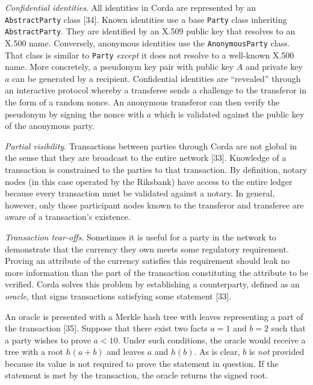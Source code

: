 \textit{Confidential identities}. All identities in Corda are represented by an \texttt{AbstractParty} class [34]. Known identities use a base \texttt{Party} class inheriting \texttt{AbstractParty}. They are identified by an X.509 public key that resolves to an X.500 name. Conversely, anonymous identities use the \texttt{AnonymousParty} class. That class is similar to \texttt{Party} \textit{except} it does not resolve to a well-known X.500 name. More concretely, a pseudonym key pair with public key $A$ and private key $a$ can be generated by a recipient. Confidential identities are ``revealed'' through an interactive protocol whereby a transferee sends a challenge to the transferor in the form of a random nonce. An anonymous transferor can then verify the pseudonym by signing the nonce with $a$ which is validated against the public key of the anonymous party.

\textit{Partial visibility}. Transactions between parties through Corda are not global in the sense that they are broadcast to the entire network [33]. Knowledge of a transaction is constrained to the parties to that transaction. By definition, notary nodes (in this case operated by the Riksbank) have access to the entire ledger because every transaction must be validated against a notary. In general, however, only those participant nodes known to the transferor and transferee are aware of a transaction's existence. 

\textit{Transaction tear-offs}. Sometimes it is useful for a party in the network to demonstrate that the currency they own meets some regulatory requirement. Proving an attribute of the currency satisfies this requirement should leak no more information than the part of the transaction constituting the attribute to be verified. Corda solves this problem by establishing a counterparty, defined as an \textit{oracle}, that signs transactions satisfying some statement [33].

An oracle is presented with a Merkle hash tree with leaves representing a part of the transaction [35]. Suppose that there exist two facts $a = 1$ and $b = 2$ such that a party wishes to prove $a < 10$. Under such conditions, the oracle would receive a tree with a root $h(a + b)$ and leaves $a$ and $h(b)$. As is clear, $b$ is \textit{not} provided because its value is not required to prove the statement in question. If the statement is met by the transaction, the oracle returns the signed root.

